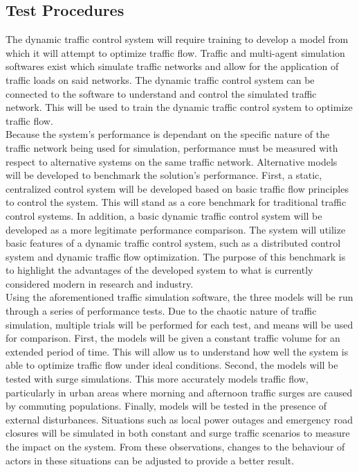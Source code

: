 \documentclass{article}
\begin{document}
\subsection{Test Procedures}

The dynamic traffic control system will require training to develop a model from which it will attempt to optimize traffic flow.
Traffic and multi-agent simulation softwares exist which simulate traffic networks and allow for the application of traffic loads on said networks.
The dynamic traffic control system can be connected to the software to understand and control the simulated traffic network.
This will be used to train the dynamic traffic control system to optimize traffic flow.\\

Because the system's performance is dependant on the specific nature of the traffic network being used for simulation, performance must be measured with respect to alternative systems on the same traffic network.
Alternative models will be developed to benchmark the solution's performance.
First, a static, centralized control system will be developed based on basic traffic flow principles to control the system.
This will stand as a core benchmark for traditional traffic control systems.
In addition, a basic dynamic traffic control system will be developed as a more legitimate performance comparison.
The system will utilize basic features of a dynamic traffic control system, such as a distributed control system and dynamic traffic flow optimization.
The purpose of this benchmark is to highlight the advantages of the developed system to what is currently considered modern in research and industry.\\

Using the aforementioned traffic simulation software, the three models will be run through a series of performance tests.
Due to the chaotic nature of traffic simulation, multiple trials will be performed for each test, and means will be used for comparison.
First, the models will be given a constant traffic volume for an extended period of time.
This will allow us to understand how well the system is able to optimize traffic flow under ideal conditions.
Second, the models will be tested with surge simulations.
This more accurately models traffic flow, particularly in urban areas where morning and afternoon traffic surges are caused by commuting populations.
Finally, models will be tested in the presence of external disturbances.
Situations such as local power outages and emergency road closures will be simulated in both constant and surge traffic scenarios to measure the impact on the system.
From these observations, changes to the behaviour of actors in these situations can be adjusted to provide a better result.\\
\end{document}
